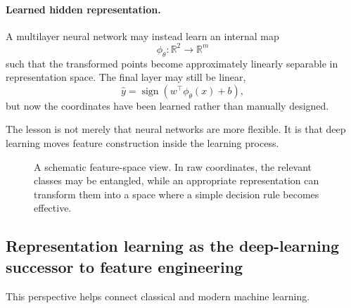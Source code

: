 \paragraph{Learned hidden representation.}
A multilayer neural network may instead learn an internal map
\[
\phi_\theta:\mathbb R^2\to\mathbb R^m
\]
such that the transformed points become approximately linearly separable in representation space. The final layer may still be linear,
\[
\hat y = \operatorname{sign}(w^\top \phi_\theta(x)+b),
\]
but now the coordinates have been learned rather than manually designed.

The lesson is not merely that neural networks are more flexible. It is that deep learning moves feature construction inside the learning process.

\begin{figure}[tbp]
\centering
{}
\caption{A schematic feature-space view. In raw coordinates, the relevant classes may be entangled, while an appropriate representation can transform them into a space where a simple decision rule becomes effective.}
\end{figure}

\subsection*{Representation learning as the deep-learning successor to feature engineering}

This perspective helps connect classical and modern machine learning.


